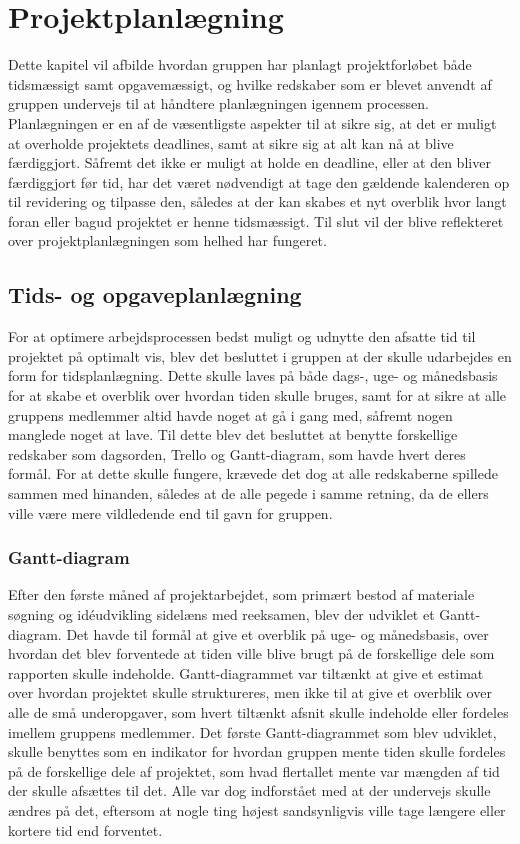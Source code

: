 \chapter{Projektplanlægning}\label{Projektplanlaegning}
Dette kapitel vil afbilde hvordan gruppen har planlagt projektforløbet både tidsmæssigt samt opgavemæssigt, og hvilke redskaber som er blevet anvendt af gruppen undervejs til at håndtere planlægningen igennem processen. Planlægningen er en af de væsentligste aspekter til at sikre sig, at det er muligt at overholde projektets deadlines, samt at sikre sig at alt kan nå at blive færdiggjort. Såfremt det ikke er muligt at holde en deadline, eller at den bliver færdiggjort før tid, har det været nødvendigt at tage den gældende kalenderen op til revidering og tilpasse den, således at der kan skabes et nyt overblik hvor langt foran eller bagud projektet er henne tidsmæssigt. Til slut vil der blive reflekteret over projektplanlægningen som helhed har fungeret.

\section{Tids- og opgaveplanlægning}\label{Tidsplanlaegning}
For at optimere arbejdsprocessen bedst muligt og udnytte den afsatte tid til projektet på optimalt vis, blev det besluttet i gruppen at der skulle udarbejdes en form for tidsplanlægning. Dette skulle laves på både dags-, uge- og månedsbasis for at skabe et overblik over hvordan tiden skulle bruges, samt for at sikre at alle gruppens medlemmer altid havde noget at gå i gang med, såfremt nogen manglede noget at lave. Til dette blev det besluttet at benytte forskellige redskaber som dagsorden, Trello og Gantt-diagram, som havde hvert deres formål. For at dette skulle fungere, krævede det dog at alle redskaberne spillede sammen med hinanden, således at de alle pegede i samme retning, da de ellers ville være mere vildledende end til gavn for gruppen.

\subsection{Gantt-diagram}\label{Gantt-diagram}
Efter den første måned af projektarbejdet, som primært bestod af materiale søgning og idéudvikling sidelæns med reeksamen, blev der udviklet et Gantt-diagram. Det havde til formål at give et overblik på uge- og månedsbasis, over hvordan det blev forventede at tiden ville blive brugt på de forskellige dele som rapporten skulle indeholde. Gantt-diagrammet var tiltænkt at give et estimat over hvordan projektet skulle struktureres, men ikke til at give et overblik over alle de små underopgaver, som hvert tiltænkt afsnit skulle indeholde eller fordeles imellem gruppens medlemmer. Det første Gantt-diagrammet som blev udviklet, skulle benyttes som en indikator for hvordan gruppen mente tiden skulle fordeles på de forskellige dele af projektet, som hvad flertallet mente var mængden af tid der skulle afsættes til det. Alle var dog indforstået med at der undervejs skulle ændres på det, eftersom at nogle ting højest sandsynligvis ville tage længere eller kortere tid end forventet.

